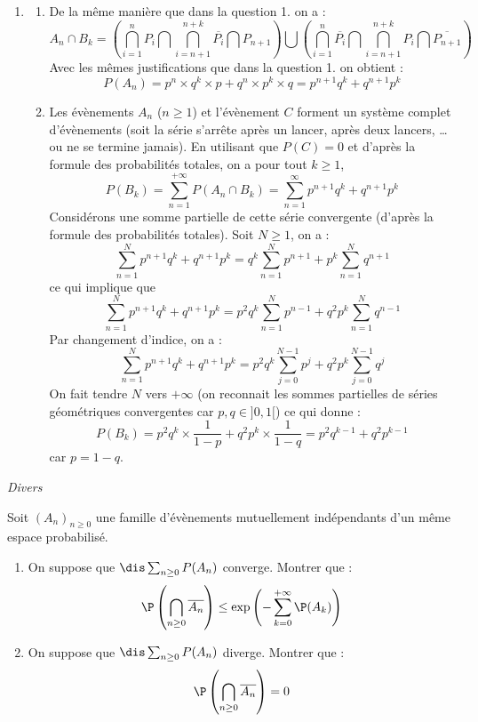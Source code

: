 \documentclass[a4paper,10pt]{report}
\begin{document}
\begin{enumerate}
\item 
\begin{enumerate}
\item De la même manière que dans la question 1. on a :
\[ A_n \cap B_k = \left( \bigcap_{i=1}^n P_i \bigcap \bigcap_{i=n+1}^{n+k} \overline{P_i} \bigcap P_{n+1} \right) \bigcup \left( \bigcap_{i=1}^n \overline{P_i} \bigcap \bigcap_{i=n+1}^{n+k} P_i \bigcap \overline{P_{n+1}} \right) \]
Avec les mêmes justifications que dans la question 1. on obtient :
\[ P(A_n) = p^n \times q^k \times p + q^n \times p^k \times q = p^{n+1} q^k + q^{n+1} p^k \]
\item Les évènements $A_n$ ($n \geq 1$) et l'évènement $C$ forment un système complet d'évènements (soit la série s'arrête après un lancer, après deux lancers, \ldots ou ne se termine jamais). En utilisant que $P(C)=0$ et d'après la formule des probabilités totales, on a pour tout $k \geq 1$,
\[ P(B_k) = \sum_{n=1}^{+ \infty} P(A_n \cap B_k) = \sum_{n=1}^{\infty} p^{n+1} q^k + q^{n+1} p^k \]
Considérons une somme partielle de cette série convergente (d'après la formule des probabilités totales). Soit $N \geq 1$, on a :
\[ \sum_{n=1}^N p^{n+1} q^k +q^{n+1} p^k = q^k \sum_{n=1}^N p^{n+1} + p^k \sum_{n=1}^N q^{n+1} \]
ce qui implique que 
\[ \sum_{n=1}^N p^{n+1} q^k +q^{n+1} p^k = p^2 q^k \sum_{n=1}^N p^{n-1} + q^2p^k \sum_{n=1}^N q^{n-1} \]
Par changement d'indice, on a :
\[ \sum_{n=1}^N p^{n+1} q^k +q^{n+1} p^k = p^2 q^k \sum_{j=0}^{N-1} p^{j} + q^2p^k \sum_{j=0}^{N-1} q^{j} \]
On fait tendre $N$ vers $+\infty$ (on reconnait les sommes partielles de séries géométriques convergentes car $p,q \in ]0,1[$) ce qui donne :
\[ P(B_k) = p^2 q^k \times \frac{1}{1-p} + q^2 p^k \times \frac{1}{1-q} = p^2 q^{k-1} + q^2 p^{k-1} \]
car $p=1-q$.
\end{enumerate}
\end{enumerate}

\medskip

\begin{center}
\textit{{ {\large Divers}}}
\end{center}

\medskip


\begin{Exa} Soit $(A_n)_{n \geq 0}$ une famille d'évènements mutuellement indépendants d'un même espace probabilisé.
\begin{enumerate}
\item On suppose que $\dis \sum_{n \geq 0} P(A_n)$ converge. Montrer que :
$$ \P \left( \bigcap_{n \geq 0} \overline{A_n} \right) \leq \exp \left(- \sum_{k=0}^{+ \infty} \P(A_k) \right)$$
\item On suppose que $\dis \sum_{n \geq 0} P(A_n)$ diverge. Montrer que :
$$ \P \left( \bigcap_{n \geq 0} \overline{A_n} \right) = 0$$
\end{enumerate}
\end{Exa}
\end{document}
